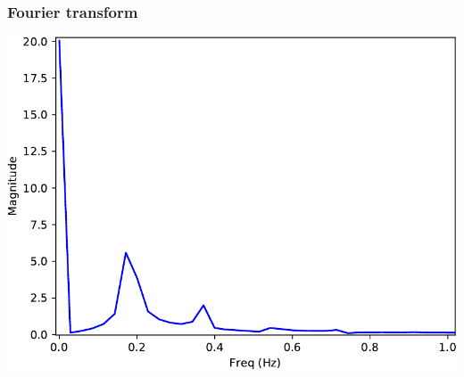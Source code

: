 \documentclass[xcolor=table]{beamer}
\begin{document}
\begin{frame}[fragile]
\frametitle{Fourier transform}

\begin{center}
	\includegraphics[width=.8\textwidth]{fourier.pdf}
\end{center}

\end{frame}

\end{document}
